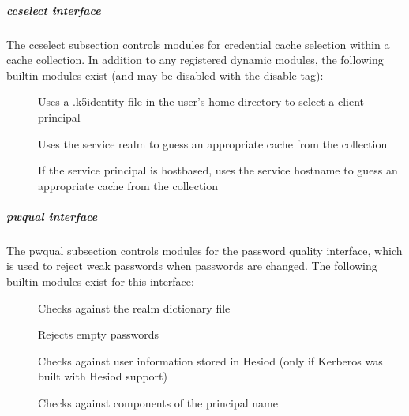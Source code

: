 \documentclass[letterpaper,10pt,english]{sphinxmanual}
\begin{document}
\subparagraph{ccselect interface}
\label{\detokenize{admin/conf_files/krb5_conf:ccselect-interface}}\label{\detokenize{admin/conf_files/krb5_conf:ccselect}}
\sphinxAtStartPar
The ccselect subsection controls modules for credential cache
selection within a cache collection.  In addition to any registered
dynamic modules, the following built\sphinxhyphen{}in modules exist (and may be
disabled with the disable tag):
\begin{description}
\item[{}] \leavevmode
\sphinxAtStartPar
Uses a .k5identity file in the user’s home directory to select a
client principal

\item[{}] \leavevmode
\sphinxAtStartPar
Uses the service realm to guess an appropriate cache from the
collection

\item[{}] \leavevmode
\sphinxAtStartPar
If the service principal is host\sphinxhyphen{}based, uses the service hostname
to guess an appropriate cache from the collection

\end{description}


\subparagraph{pwqual interface}
\label{\detokenize{admin/conf_files/krb5_conf:pwqual-interface}}\label{\detokenize{admin/conf_files/krb5_conf:pwqual}}
\sphinxAtStartPar
The pwqual subsection controls modules for the password quality
interface, which is used to reject weak passwords when passwords are
changed.  The following built\sphinxhyphen{}in modules exist for this interface:
\begin{description}
\item[{}] \leavevmode
\sphinxAtStartPar
Checks against the realm dictionary file

\item[{}] \leavevmode
\sphinxAtStartPar
Rejects empty passwords

\item[{}] \leavevmode
\sphinxAtStartPar
Checks against user information stored in Hesiod (only if Kerberos
was built with Hesiod support)

\item[{}] \leavevmode
\sphinxAtStartPar
Checks against components of the principal name

\end{description}
\end{document}
